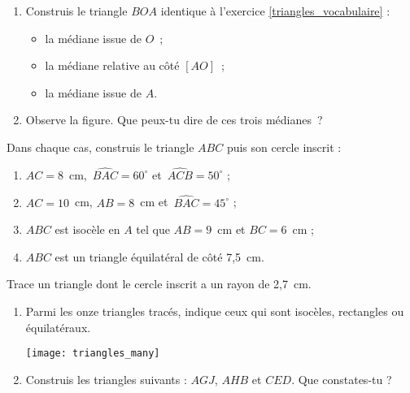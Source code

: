 \begin{exercice}[Médiane]
\begin{enumerate}
 \item Construis le triangle $BOA$ identique à l'exercice \ref{triangles_vocabulaire} :
 \begin{itemize}
  \item la médiane issue de $O$ ;
  \item la médiane relative au côté $[AO]$ ;
  \item la médiane issue de $A$.
  \end{itemize}
 \item Observe la figure. Que peux-tu dire de ces trois médianes ?
 \end{enumerate}
\end{exercice}


\begin{exercice}
Dans chaque cas, construis le triangle $ABC$ puis son cercle inscrit :
\begin{enumerate}
 \item $AC = 8$ cm, $\widehat{BAC} = 60^\circ$ et $\widehat{ACB} = 50^\circ$ ;
 \item $AC = 10$ cm, $AB = 8$ cm et $\widehat{BAC} = 45^\circ$ ;
 \item $ABC$ est isocèle en $A$ tel que $AB = 9$ cm et $BC = 6$ cm ;
 \item $ABC$ est un triangle équilatéral de côté 7,5 cm.
 \end{enumerate}
\end{exercice}


\begin{exercice}
Trace un triangle dont le cercle inscrit a un rayon de 2,7 cm.
\end{exercice}


\begin{exercice}
\begin{enumerate}
 \item Parmi les onze triangles tracés, indique ceux qui sont isocèles, rectangles ou équilatéraux.
 \begin{center} \texttt{[image: triangles\_many]} \end{center}
 \item Construis les triangles suivants : $AGJ$, $AHB$ et $CED$. Que constates-tu ?
 \end{enumerate}
\end{exercice}
